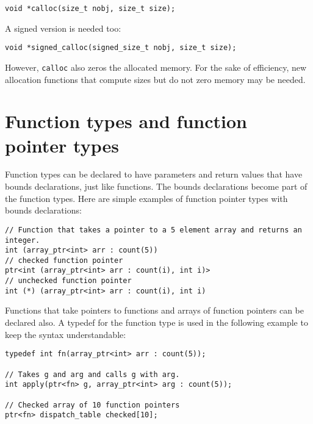 \begin{verbatim}
void *calloc(size_t nobj, size_t size);
\end{verbatim}

A signed version is needed too:
\begin{verbatim}
void *signed_calloc(signed_size_t nobj, size_t size);
\end{verbatim}
However, \texttt{calloc} also zeros the allocated memory.  For the sake of efficiency,
new allocation functions that compute sizes but do not zero memory may be needed.

\section{Function types and function pointer types}
\label{section:function-types}

Function types can be declared to have parameters and return values that have bounds
declarations, just like functions.  The bounds declarations become part of the function types.
Here are simple examples of function pointer types with bounds declarations:
\begin{verbatim}
// Function that takes a pointer to a 5 element array and returns an integer.
int (array_ptr<int> arr : count(5))
// checked function pointer
ptr<int (array_ptr<int> arr : count(i), int i)>
// unchecked function pointer
int (*) (array_ptr<int> arr : count(i), int i)
\end{verbatim}
Functions that take pointers to functions and arrays of function pointers can
be declared also.  A typedef for the function type is used in the following example
to keep the syntax understandable:
\begin{verbatim}
typedef int fn(array_ptr<int> arr : count(5));

// Takes g and arg and calls g with arg.
int apply(ptr<fn> g, array_ptr<int> arg : count(5));

// Checked array of 10 function pointers
ptr<fn> dispatch_table checked[10];
\end{verbatim}

